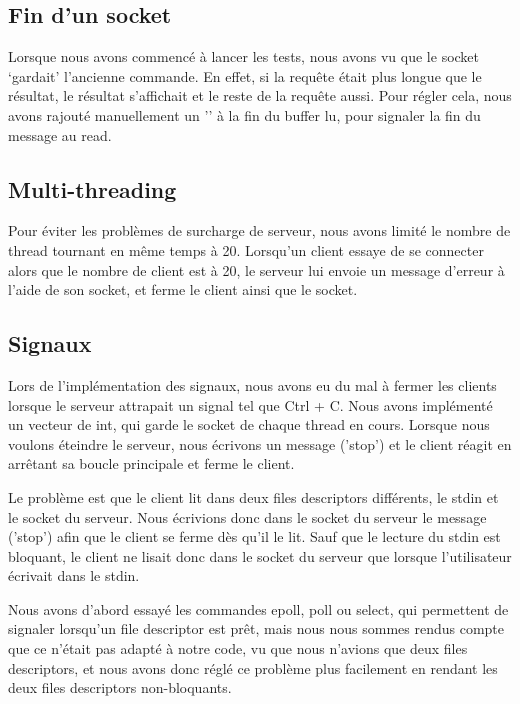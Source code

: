 \documentclass[utf8]{article}
\begin{document}
\begin{large}
\subsection{Fin d'un socket}
\par
\indent

Lorsque nous avons commencé à lancer les tests, nous avons vu que le socket
`gardait' l'ancienne commande. En effet, si la requête était plus longue que le
résultat, le résultat s'affichait et le reste de la requête aussi. Pour régler
cela, nous avons rajouté manuellement un '' à la fin du buffer lu, pour
signaler la fin du message au read.   

\par
\subsection{Multi-threading}

\par 
\indent

Pour éviter les problèmes de surcharge de serveur, nous avons limité le nombre
de thread tournant en même temps à 20. Lorsqu'un client essaye de se connecter
alors que le nombre de client est à 20, le serveur lui envoie un message
d'erreur à l'aide de son socket, et ferme le client ainsi que le socket.

\par
\subsection{Signaux}
\par
\indent

Lors de l'implémentation des signaux, nous avons eu du mal à fermer les clients
lorsque le serveur attrapait un signal tel que Ctrl + C. Nous avons implémenté
un vecteur de int, qui garde le socket de chaque thread en cours. Lorsque nous
voulons éteindre le serveur, nous écrivons un message ('stop') et le client
réagit en arrêtant sa boucle principale et ferme le client.

Le problème est que le client lit dans deux files descriptors différents, le stdin et le socket du serveur. 
Nous écrivions donc dans le socket du serveur le message ('stop') afin que le client
se ferme dès qu'il le lit. Sauf que le lecture du stdin est bloquant, le
client ne lisait donc dans le socket du serveur que lorsque l'utilisateur
écrivait dans le stdin. 
\par
\par
Nous avons d'abord essayé les commandes epoll, poll ou select, qui permettent de
signaler lorsqu'un file descriptor est prêt, mais nous nous sommes rendus compte
que ce n'était pas adapté à notre code, vu que nous n'avions que deux files
descriptors, et nous avons donc réglé ce problème plus facilement en rendant les
deux files descriptors non-bloquants.
\par

\end{large}
\end{document}
